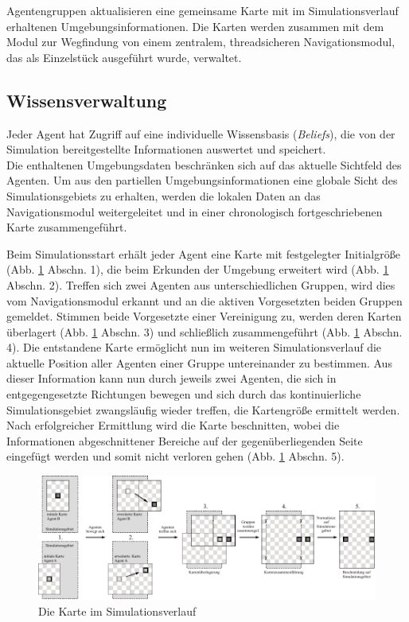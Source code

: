 \documentclass[runningheads]{llncs}
\begin{document}
Agentengruppen aktualisieren eine gemeinsame Karte mit im Simulationsverlauf erhaltenen Umgebungsinformationen. Die Karten werden zusammen mit dem Modul zur Wegfindung von einem zentralem, threadsicheren Navigationsmodul, das als Einzelstück ausgeführt wurde, verwaltet. 


\subsection{Wissensverwaltung}\label{wissensverwaltung}
Jeder Agent hat Zugriff auf eine individuelle Wissensbasis (\textit{Beliefs}), die von der Simulation bereitgestellte Informationen auswertet und speichert. \\
Die enthaltenen Umgebungsdaten beschränken sich auf das aktuelle Sichtfeld des Agenten.
Um aus den partiellen Umgebungsinformationen eine globale Sicht des Simulationsgebiets zu erhalten, werden die lokalen Daten an das Navigationsmodul weitergeleitet und in einer chronologisch fortgeschriebenen Karte zusammengeführt.

Beim Simulationsstart erhält jeder Agent eine Karte mit festgelegter Initialgröße (Abb. \ref{Karte} Abschn. 1), die beim Erkunden der Umgebung erweitert wird (Abb. \ref{Karte} Abschn. 2). Treffen sich zwei Agenten aus unterschiedlichen Gruppen, wird dies vom Navigationsmodul erkannt und an die aktiven Vorgesetzten beiden Gruppen gemeldet. Stimmen beide Vorgesetzte einer Vereinigung zu, werden deren Karten überlagert (Abb. \ref{Karte} Abschn. 3) und schließlich zusammengeführt (Abb. \ref{Karte} Abschn. 4). Die entstandene Karte ermöglicht nun im weiteren Simulationsverlauf die aktuelle Position aller Agenten einer Gruppe untereinander zu bestimmen. Aus dieser Information kann nun durch jeweils zwei Agenten, die sich in entgegengesetzte Richtungen bewegen und sich durch das kontinuierliche Simulationsgebiet zwangsläufig wieder treffen, die Kartengröße ermittelt werden. Nach erfolgreicher Ermittlung wird die Karte beschnitten, wobei die Informationen abgeschnittener Bereiche auf der gegenüberliegenden Seite eingefügt werden und somit nicht verloren gehen (Abb. \ref{Karte} Abschn. 5).
\begin{figure}[h]
\includegraphics[scale=0.8]{./Referenzen/Kartenmerge.pdf}
\caption{Die Karte im Simulationsverlauf}
\label{Karte}
\end{figure}
\end{document}
